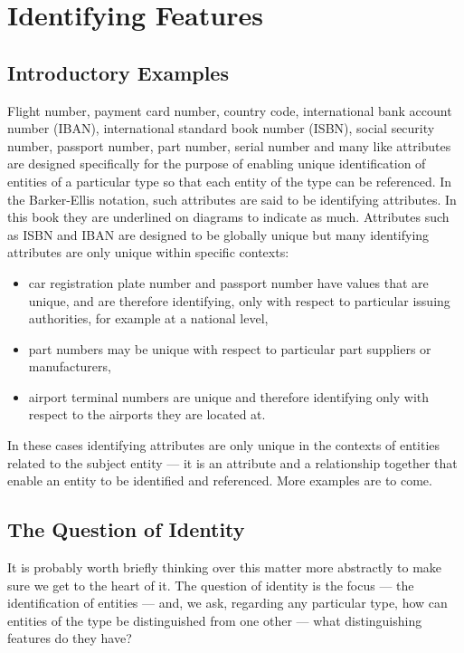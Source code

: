 \section{Identifying Features}
\label{IdentifyingFeatures}

\subsection{Introductory Examples}

\mynote
Flight number, payment card number, country code, international bank account number (IBAN), 
international standard book number (ISBN), social security number, passport number, part number, serial number and many like attributes are designed specifically for the purpose of enabling unique identification of entities of a particular type so that each entity of the type can be referenced. 
In the Barker-Ellis notation, such attributes are said to be identifying attributes. In this book they are underlined 
on diagrams to indicate as much. 
Attributes such as ISBN and IBAN are designed to be globally unique but many identifying attributes are only unique within specific contexts:
\begin{itemize}
\item
car registration plate number and passport number have values that are unique, and are therefore identifying, only with respect to particular issuing authorities, for example at a national level,
\item part numbers may be unique with respect to particular part suppliers or manufacturers,
\item airport terminal numbers are unique and therefore identifying only with respect to the airports they are located at.
\end{itemize}
In these cases identifying attributes are only unique in the contexts of entities related to the subject entity --- it is an attribute and a relationship together that enable an entity to be identified and referenced. More examples are to come.

\subsection{The Question of Identity}
\mynote
It is probably worth briefly thinking over this matter more abstractly to make sure we get to the heart of it. The question of identity is the focus --- the identification of entities ---  and, we ask, regarding any particular type, how can entities of the type be distinguished from one other 
--- what distinguishing features do they have? 

